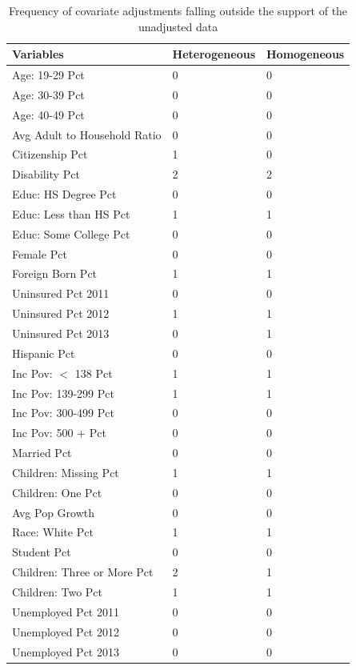 \begin{table}[h!]
\centering
    \caption{Frequency of covariate adjustments falling outside the support of the unadjusted data}
    \label{tab:extreme1}
\begin{tabular}{lll}
  \hline
Variables & Heterogeneous & Homogeneous \\ 
  \hline
Age: 19-29 Pct & 0 & 0 \\ 
  Age: 30-39 Pct & 0 & 0 \\ 
  Age: 40-49 Pct & 0 & 0 \\ 
  Avg Adult to Household Ratio & 0 & 0 \\ 
  Citizenship Pct & 1 & 0 \\ 
  Disability Pct & 2 & 2 \\ 
  Educ: HS Degree Pct & 0 & 0 \\ 
  Educ: Less than HS Pct & 1 & 1 \\ 
  Educ: Some College Pct & 0 & 0 \\ 
  Female Pct & 0 & 0 \\ 
  Foreign Born Pct & 1 & 1 \\ 
  Uninsured Pct 2011 & 0 & 0 \\ 
  Uninsured Pct 2012 & 1 & 1 \\ 
  Uninsured Pct 2013 & 0 & 1 \\ 
  Hispanic Pct & 0 & 0 \\ 
  Inc Pov: $<$ 138 Pct & 1 & 1 \\ 
  Inc Pov: 139-299 Pct & 1 & 1 \\ 
  Inc Pov: 300-499 Pct & 0 & 0 \\ 
  Inc Pov: 500 + Pct & 0 & 0 \\ 
  Married Pct & 0 & 0 \\ 
  Children: Missing Pct & 1 & 1 \\ 
  Children: One Pct & 0 & 0 \\ 
  Avg Pop Growth & 0 & 0 \\ 
  Race: White Pct & 1 & 1 \\ 
  Student Pct & 0 & 0 \\ 
  Children: Three or More Pct & 2 & 1 \\ 
  Children: Two Pct & 1 & 1 \\ 
  Unemployed Pct 2011 & 0 & 0 \\ 
  Unemployed Pct 2012 & 0 & 0 \\ 
  Unemployed Pct 2013 & 0 & 0 \\ 
   \hline
\end{tabular}
\end{table}

